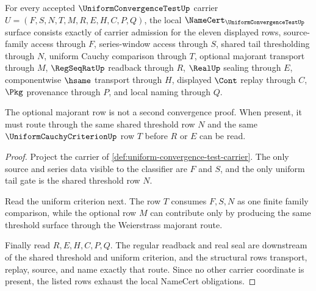\begin{theorem}
\label{thm:uniform-convergence-test-namecert-obligations}
For every accepted $\UniformConvergenceTestUp$ carrier $U=(F,S,N,T,M,R,E,H,C,P,Q)$, the local $\NameCert_{\UniformConvergenceTestUp}$ surface consists exactly of carrier admission for the eleven displayed rows, source-family access through $F$, series-window access through $S$, shared tail thresholding through $N$, uniform Cauchy comparison through $T$, optional majorant transport through $M$, $\RegSeqRatUp$ readback through $R$, $\RealUp$ sealing through $E$, componentwise $\hsame$ transport through $H$, displayed $\Cont$ replay through $C$, $\Pkg$ provenance through $P$, and local naming through $Q$.

The optional majorant row is not a second convergence proof. When present, it must route through the same shared threshold row $N$ and the same $\UniformCauchyCriterionUp$ row $T$ before $R$ or $E$ can be read.
\end{theorem}
\begin{proof}
Project the carrier of \autoref{def:uniform-convergence-test-carrier}. The only source and series data visible to the classifier are $F$ and $S$, and the only uniform tail gate is the shared threshold row $N$.

Read the uniform criterion next. The row $T$ consumes $F,S,N$ as one finite family comparison, while the optional row $M$ can contribute only by producing the same threshold surface through the Weierstrass majorant route.

Finally read $R,E,H,C,P,Q$. The regular readback and real seal are downstream of the shared threshold and uniform criterion, and the structural rows transport, replay, source, and name exactly that route. Since no other carrier coordinate is present, the listed rows exhaust the local NameCert obligations.
\end{proof}

